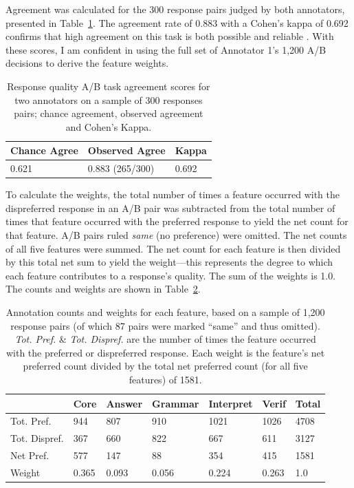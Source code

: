 Agreement was calculated for the 300 response pairs judged by both annotators, presented in Table~\ref{tab:ABAgreement}. The agreement rate of 0.883 with a Cohen's kappa of 0.692 confirms that high agreement on this task is both possible and reliable \citep{landis1977measurement, artstein:massimo:2008}. With these scores, I am confident in using the full set of Annotator 1's 1,200 A/B decisions to derive the feature weights.

\begin{table}[htb!]
\begin{center}
\begin{tabular}{|l|l|l|}
\hline
 Chance Agree & Observed Agree & Kappa \\
\hline
0.621 & 0.883 (265/300) & 0.692 \\
\hline
\end{tabular}
\caption{\label{tab:ABAgreement} Response quality A/B task agreement scores for two annotators on a sample of 300 responses pairs; chance agreement, observed agreement and Cohen's Kappa.}
\end{center}
\end{table}

To calculate the weights, the total number of times a feature occurred with the dispreferred response in an A/B pair was subtracted from the total number of times that feature occurred with the preferred response to yield the net count for that feature. A/B pairs ruled \textit{same} (no preference) were omitted. The net counts of all five features were summed. The net count for each feature is then divided by this total net sum to yield the weight---this represents the degree to which each feature contributes to a response's quality. The sum of the weights is 1.0. The counts and weights are shown in Table~\ref{tab:feature-weights}.

\begin{table}[htb!]
\begin{center}
\begin{tabular}{|l|l|l|l|l|l|l|}
\hline
	& Core	& Answer & Grammar & Interpret & Verif & Total \\
\hline
\hline
Tot. Pref. & 944 & 807 & 910 & 1021 & 1026 & 4708 \\
\hline
Tot. Dispref. & 367 & 660 & 822 & 667 & 611 & 3127 \\
\hline
Net Pref. & 577 & 147 & 88 & 354 & 415 & 1581 \\ 
\hline
Weight & 0.365 & 0.093 & 0.056 & 0.224 & 0.263 & 1.0 \\
\hline
\end{tabular}
\caption{\label{tab:feature-weights} Annotation counts and weights for each feature, based on a sample of 1,200 response pairs (of which 87 pairs were marked ``same'' and thus omitted). \textit{Tot. Pref.} \& \textit{Tot. Dispref.} are the number of times the feature occurred with the preferred or dispreferred response. Each weight is the feature's net preferred count divided by the total net preferred count (for all five features) of 1581.}
\end{center}
\end{table}

